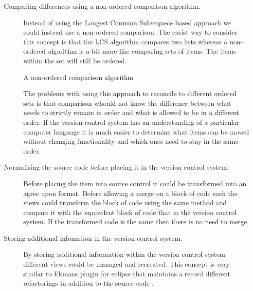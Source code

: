 \begin{description}
  \item [Comparing differences using a non-ordered comparison algorithm.]   
    Instead of using the Longest Common Subsequece based approach we could instead use a non-ordered comparison.  The easist way to consider this concept is that the LCS algorithm compares two lists whereas a non-ordered algorithm is a bit more like comparing sets of items. The items within the set will still be ordered.

    \begin{algorithm}[H]
    \SetAlgoLined
    \caption{A non-ordered comparison algorithm}
    \end{algorithm}


    The problems with using this approach to reconcile to different ordered sets is that comparison whould not know the difference between what needs to strictly remain in order and what is allowed to be in a different order. If the version control system has an understanding of a particular computer language it is much easier to determine what items can be moved without changing functionality and which ones need to stay in the same order. 
  \item [Normalising the source code before placing it in the version control system.]
    Before placing the item into source control it could be transformed into an agree upon format. Before allowing a merge on a block of code each the views could transform the block of code using the same method and compare it with the equivelent block of code that in the version control system. If the transformed code is the same then there is no need to merge.
  \item [Storing additional infomation in the version control system.]
    By storing additional information within the version control system different views could be managed and recreated.
    This concept is very similar to Ekmans plugin for eclipse that maintains a record different refactorings in addition to the source code \cite{Ekman2004}.


\end{description}
